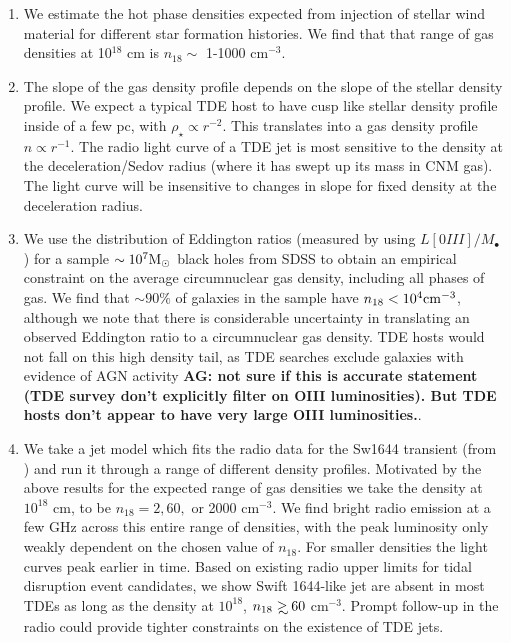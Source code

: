 \documentclass[usenatbib,fleqn]{mnras}
\newcommand\gsim{\mathrel{\rlap{\lower4pt\hbox{\hskip1pt$\sim$}}
    \raise1pt\hbox{$>$}}}
\newcommand{\Mbh}[1][]{M_{\bullet#1}}
\newcommand{\Msun}{{\rm M_\odot}}
\begin{document}
\begin{enumerate}
\item We estimate the hot phase densities expected from injection of
  stellar wind material for different star formation histories. We
  find that that range of gas densities at 10$^{18}$ cm is $n_{18}
  \sim$ 1-1000 cm$^{-3}$.

\item The slope of the gas density profile depends on the slope of the
  stellar density profile. We expect a typical TDE host to have cusp
  like stellar density profile inside of a few pc, with $\rho_\star
  \propto r^{-2}$. This translates into a gas density profile $n
  \propto r^{-1}$. The radio light curve of a TDE jet is most
  sensitive to the density at the deceleration/Sedov radius (where it
  has swept up its mass in CNM gas). The light curve will be
  insensitive to changes in slope for fixed density at the
  deceleration radius.

\item We use the distribution of Eddington ratios (measured by
  \citealt{Kauffmann&Heckman2009} using $L[0III]/\Mbh$) for a sample
  $\sim 10^{7} \Msun$ black holes from SDSS to obtain an empirical
  constraint on the average circumnuclear gas density, including all
  phases of gas. We find that $\sim90\%$ of galaxies in the sample
  have $n_{18}<10^{4} {\rm cm}^{-3}$, although we note that there is
  considerable uncertainty in translating an observed Eddington ratio
  to a circumnuclear gas density. TDE hosts would not fall on this
  high density tail, as TDE searches exclude galaxies with evidence of
  AGN activity {\bf AG: not sure if this is accurate statement (TDE
    survey don't explicitly filter on OIII luminosities). But TDE
    hosts don't appear to have very large OIII luminosities.}.

\item We take a jet model which fits the radio data for the Sw1644
  transient (from \citealt{Mimica+2015}) and run it through a range of
  different density profiles. Motivated by the above results for the
  expected range of gas densities we take the density at $10^{18}$ cm,
  to be $n_{18}=2, 60,$ or 2000 cm$^{-3}$. We find bright radio
  emission at a few GHz across this entire range of densities, with
  the peak luminosity only weakly dependent on the chosen value of
  $n_{18}$.  For smaller densities the light curves peak earlier in
  time. Based on existing radio upper limits for tidal disruption
  event candidates, we show Swift 1644-like jet are absent in most TDEs
  as long as the density at $10^{18}$, $n_{18} \gsim  60$
  cm$^{-3}$. Prompt follow-up in the radio could provide tighter
  constraints on the existence of TDE jets.  
\end{enumerate}
\end{document}
